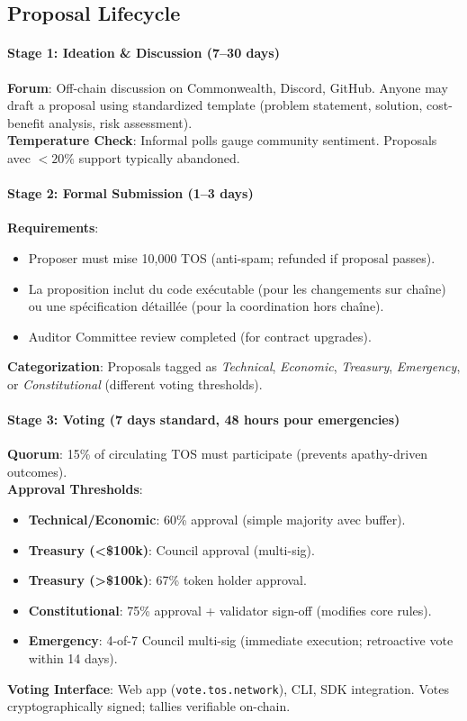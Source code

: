 \documentclass[11pt]{article}
\begin{document}
\subsection{Proposal Lifecycle}

\paragraph{Stage 1: Ideation \& Discussion (7--30 days)}
\textbf{Forum}: Off-chain discussion on Commonwealth, Discord, GitHub. Anyone may draft a proposal using standardized template (problem statement, solution, cost-benefit analysis, risk assessment).\\
\textbf{Temperature Check}: Informal polls gauge community sentiment. Proposals avec $<20\%$ support typically abandoned.

\paragraph{Stage 2: Formal Submission (1--3 days)}
\textbf{Requirements}:
\begin{itemize}[noitemsep]
  \item Proposer must mise 10,000 TOS (anti-spam; refunded if proposal passes).
  \item La proposition inclut du code exécutable (pour les changements sur chaîne) ou une spécification détaillée (pour la coordination hors chaîne).
  \item Auditor Committee review completed (for contract upgrades).
\end{itemize}
\textbf{Categorization}: Proposals tagged as \emph{Technical}, \emph{Economic}, \emph{Treasury}, \emph{Emergency}, or \emph{Constitutional} (different voting thresholds).

\paragraph{Stage 3: Voting (7 days standard, 48 hours pour emergencies)}
\textbf{Quorum}: 15\% of circulating TOS must participate (prevents apathy-driven outcomes).\\
\textbf{Approval Thresholds}:
\begin{itemize}[noitemsep]
  \item \textbf{Technical/Economic}: 60\% approval (simple majority avec buffer).
  \item \textbf{Treasury (<\$100k)}: Council approval (multi-sig).
  \item \textbf{Treasury (>\$100k)}: 67\% token holder approval.
  \item \textbf{Constitutional}: 75\% approval + validator sign-off (modifies core rules).
  \item \textbf{Emergency}: 4-of-7 Council multi-sig (immediate execution; retroactive vote within 14 days).
\end{itemize}
\textbf{Voting Interface}: Web app (\texttt{vote.tos.network}), CLI, SDK integration. Votes cryptographically signed; tallies verifiable on-chain.
\end{document}
